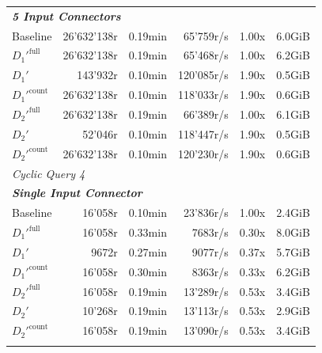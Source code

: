 \begin{longtable}{lrrrrr}
    \multicolumn{6}{l}{\textit{\textbf{5 Input Connectors}}} \\
    \nopagebreak
    Baseline              &  26'632'138r          &  0.19min        &  65'759r/s           & 1.00x             & 6.0GiB    \\
    $D_1'^{\text{full}}$   &  26'632'138r          &  0.19min        &  65'468r/s           & 1.00x             & 6.2GiB    \\
    \quad $D_1'$           &  143'932r             &  0.10min        &  120'085r/s          & 1.90x             & 0.5GiB    \\
    $D_1'^{\text{count}}$  &  26'632'138r          &  0.10min        &  118'033r/s         & 1.90x             & 0.6GiB    \\
    $D_2'^{\text{full}}$   &  26'632'138r          &  0.19min        &  66'389r/s           & 1.00x             & 6.1GiB    \\
    \quad $D_2'$           &  52'046r              &  0.10min        &  118'447r/s          & 1.90x             & 0.5GiB    \\
    $D_2'^{\text{count}}$  &  26'632'138r          &  0.10min        &  120'230r/s          & 1.90x             & 0.6GiB    \\
    \midrule

    \multicolumn{6}{l}{\textit{Cyclic Query 4}} \\
    \midrule
    \multicolumn{6}{l}{\textit{\textbf{Single Input Connector}}} \\
    \nopagebreak
    Baseline              &  16'058r              &  0.10min            &  23'836r/s           & 1.00x             & 2.4GiB    \\
    $D_1'^{\text{full}}$   &  16'058r              &  0.33min            &  7683r/s             & 0.30x             & 8.0GiB   \\
    \quad $D_1'$           &  9672r                &  0.27min            &  9077r/s             & 0.37x             & 5.7GiB    \\
    $D_1'^{\text{count}}$  &  16'058r              &  0.30min            &  8363r/s             & 0.33x             & 6.2GiB    \\
    $D_2'^{\text{full}}$   &  16'058r              &  0.19min            &  13'289r/s           & 0.53x             & 3.4GiB    \\
    \quad $D_2'$           &  10'268r              &  0.19min            &  13'113r/s           & 0.53x             & 2.9GiB    \\
    $D_2'^{\text{count}}$  &  16'058r              &  0.19min            &  13'090r/s           & 0.53x             & 3.4GiB    \\
    \addlinespace 
    

\end{longtable}
